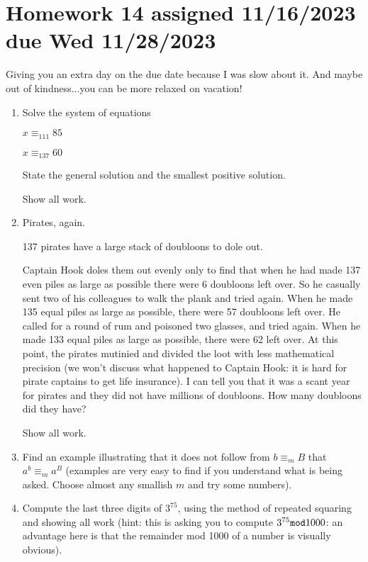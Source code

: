 \documentclass[12pt]{article}
\begin{document}
\section{Homework 14 assigned 11/16/2023 due Wed 11/28/2023}

Giving you an extra day on the due date because I was slow about it.  And maybe out of kindness...you can be more relaxed on vacation!

\begin{enumerate}




\item  Solve the system of equations

$x \equiv_{111} 85$

$x \equiv_{137} 60$

State the general solution and the smallest positive solution.

Show all work.

\item  Pirates, again.

137 pirates have a large stack of doubloons to dole out.

Captain Hook doles them out evenly only to find that when he had made 137 even piles as large as possible there were 6 doubloons left over.
So he casually sent two of his colleagues to walk the plank and tried again.  When he made 135 equal piles as large as possible, there were 57 doubloons left over.   He called for a round of rum and poisoned two glasses, and tried again.  When he made 133 equal piles as large as possible, there were 62 left over.  At this point, the pirates mutinied and divided the loot with less mathematical precision (we won't discuss what happened to Captain Hook: it is hard for pirate captains to get life insurance).  I can tell you that it was a scant year for pirates and they did not have millions of doubloons.  How many doubloons did they have?

Show all work.

\item  Find an example illustrating that it does not follow from $b \equiv_m B$ that $a^b \equiv_m a^B$ (examples are very easy to find if you understand what is being asked.  Choose almost any smallish $m$ and try some numbers).

\item  Compute the last three digits of $3^{75}$, using the method of repeated squaring and showing all work  (hint:  this is asking you to compute $3^{75} {\tt mod} 1000$:  an advantage here is that the remainder mod 1000 of a number is visually obvious).


\end{enumerate}
\end{document}
